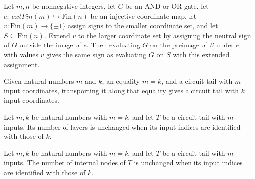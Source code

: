 \begin{theorem}
\label{FABL.CircuitGate.evalFinset_embeddingPreimage_extend}
\leanok
{}
Let $m,n$ be nonnegative integers, let $G$ be an AND or OR gate, let
$e:\	ext{Fin}(m)\hookrightarrow\text{Fin}(n)$ be an injective coordinate map, let
$v:\text{Fin}(m)\to\{\pm1\}$ assign signs to the smaller coordinate set, and let
$S\subseteq\text{Fin}(n)$. Extend $v$ to the larger coordinate set by assigning the
neutral sign of $G$ outside the image of $e$. Then evaluating $G$ on the preimage of $S$
under $e$ with values $v$ gives the same sign as evaluating $G$ on $S$ with this
extended assignment.
\end{theorem}

\begin{definition}
\label{FABL.CircuitTail.castInput}
\leanok
{}
Given natural numbers $m$ and $k$, an equality $m=k$, and a circuit tail with $m$ input
coordinates, transporting it along that equality gives a circuit tail with $k$ input
coordinates.
\end{definition}

\begin{theorem}
\label{FABL.CircuitTail.layerCount_castInput}
\leanok
{}
Let $m,k$ be natural numbers with $m=k$, and let $T$ be a circuit tail with $m$ inputs.
Its number of layers is unchanged when its input indices are identified with those of
$k$.
\end{theorem}

\begin{theorem}
\label{FABL.CircuitTail.internalNodeCount_castInput}
\leanok
{}
Let $m,k$ be natural numbers with $m=k$, and let $T$ be a circuit tail with $m$ inputs.
The number of internal nodes of $T$ is unchanged when its input indices are identified
with those of $k$.
\end{theorem}

